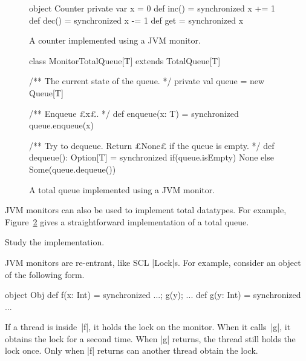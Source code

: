 
\begin{figure}
\begin{scala}
object Counter{
  private var x = 0
  def inc() = synchronized{ x += 1 }
  def dec() = synchronized{ x -= 1 }
  def get = synchronized{ x }
}
\end{scala}
\caption{A counter implemented using a JVM monitor.}
\label{fig:counter-monitor}
\end{figure}



\begin{figure}
\begin{scala}
class MonitorTotalQueue[T] extends TotalQueue[T]{
  /** The current state of the queue. */
  private val queue = new Queue[T]

  /** Enqueue £x£. */
  def enqueue(x: T) = synchronized{ queue.enqueue(x) }

  /** Try to dequeue.  Return £None£ if the queue is empty. */
  def dequeue(): Option[T] = synchronized{ 
    if(queue.isEmpty) None else Some(queue.dequeue()) 
  }
}
\end{scala}
\caption{A total queue implemented using a JVM monitor.}
\label{fig:totalQueue-JVM-monitor}
\end{figure}

JVM monitors can also be used to implement total datatypes.  For example,
Figure~\ref{fig:totalQueue-JVM-monitor} gives a straightforward implementation
of a total queue. 

\begin{instruction}
Study the implementation.
\end{instruction}


JVM monitors are re-entrant, like SCL |Lock|s.  For example, consider an
object of the following form.
%
\begin{mysamepage}
\begin{scala}
object Obj{
  def f(x: Int) = synchronized{ ...; g(y); ... }
  def g(y: Int) = synchronized{ ... }
}
\end{scala}
\end{mysamepage}
%
If a thread is inside~|f|, it holds the lock on the monitor.  When it
calls~|g|, it obtains the lock for a second time.  When |g| returns, the
thread still holds the lock once.  Only when |f| returns can another thread
obtain the lock.

